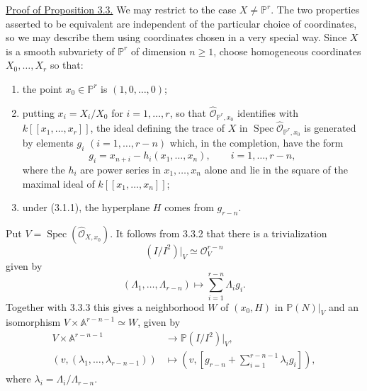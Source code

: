 \noindent\underline{Proof of Proposition 3.3.}
We may restrict to the case $X\ne\mathbb P^r$.  The two properties
asserted to be equivalent are independent of the particular choice of
coordinates, so we may describe them using coordinates chosen in a
very special way.  Since $X$ is a smooth subvariety of $\mathbb P^r$
of dimension $n\geq1$, choose homogeneous coordinates
$X_0,\ldots,X_r$ so that:
\begin{enumerate}
\item[3.3.1.] the point $x_0\in\mathbb P^r$ is $(1,0,\ldots,0)$;
\item[3.3.2.] putting $x_i=X_i/X_0$ for $i=1,\ldots,r$, so that
$\widehat{\mathcal O}_{\mathbb P^r,x_0}$ identifies with
$k[[x_1,\ldots,x_r]]$, the ideal defining the trace of $X$ in
$\operatorname{Spec}\widehat{\mathcal O}_{\mathbb P^r,x_0}$ is
generated by elements $g_i$ $(i=1,\ldots,r-n)$ which, in the
completion, have the form
\[
g_i=x_{n+i}-h_i(x_1,\ldots,x_n),
\qquad i=1,\ldots,r-n,
\]
where the $h_i$ are power series in $x_1,\ldots,x_n$ alone and lie in
the square of the maximal ideal of $k[[x_1,\ldots,x_n]]$;
\item[3.3.3.] under (3.1.1), the hyperplane $H$ comes from
$g_{r-n}$.
\end{enumerate}

Put $V=\operatorname{Spec}(\widehat{\mathcal O}_{X,x_0})$.  It follows
from 3.3.2 that there is a trivialization
\[
(I/I^2)|_V\simeq\mathcal O_V^{r-n}
\]
given by
\begin{equation}\tag{3.3.4}
(\Lambda_1,\ldots,\Lambda_{r-n})\longmapsto
\sum_{i=1}^{r-n}\Lambda_i g_i.
\end{equation}
Together with 3.3.3 this gives a neighborhood $W$ of $(x_0,H)$ in
$\mathbb P(N)|_V$ and an isomorphism
$V\times\mathbb A^{r-n-1}\simeq W$, given by
\begin{equation}\tag{3.3.5}
\begin{aligned}
V\times\mathbb A^{r-n-1}&\longrightarrow\mathbb P(I/I^2)|_V,\\
(v,(\lambda_1,\ldots,\lambda_{r-n-1}))&\longmapsto
\left(v,\left[g_{r-n}+\sum_{i=1}^{r-n-1}\lambda_i g_i\right]\right),
\end{aligned}
\end{equation}
where $\lambda_i=\Lambda_i/\Lambda_{r-n}$.

